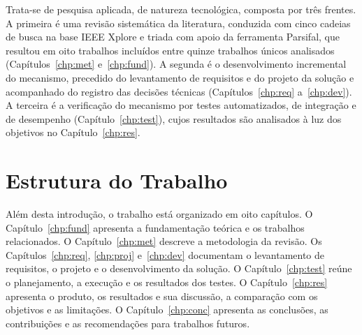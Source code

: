 Trata-se de pesquisa aplicada, de natureza tecnológica, composta por três frentes. A primeira é uma revisão sistemática da literatura, conduzida com cinco cadeias de busca na base IEEE Xplore e triada com apoio da ferramenta Parsifal, que resultou em oito trabalhos incluídos entre quinze trabalhos únicos analisados (Capítulos~\ref{chp:met} e~\ref{chp:fund}). A segunda é o desenvolvimento incremental do mecanismo, precedido do levantamento de requisitos e do projeto da solução e acompanhado do registro das decisões técnicas (Capítulos~\ref{chp:req} a~\ref{chp:dev}). A terceira é a verificação do mecanismo por testes automatizados, de integração e de desempenho (Capítulo~\ref{chp:test}), cujos resultados são analisados à luz dos objetivos no Capítulo~\ref{chp:res}.

\section{Estrutura do Trabalho}

Além desta introdução, o trabalho está organizado em oito capítulos. O Capítulo~\ref{chp:fund} apresenta a fundamentação teórica e os trabalhos relacionados. O Capítulo~\ref{chp:met} descreve a metodologia da revisão. Os Capítulos~\ref{chp:req}, \ref{chp:proj} e~\ref{chp:dev} documentam o levantamento de requisitos, o projeto e o desenvolvimento da solução. O Capítulo~\ref{chp:test} reúne o planejamento, a execução e os resultados dos testes. O Capítulo~\ref{chp:res} apresenta o produto, os resultados e sua discussão, a comparação com os objetivos e as limitações. O Capítulo~\ref{chp:conc} apresenta as conclusões, as contribuições e as recomendações para trabalhos futuros.
